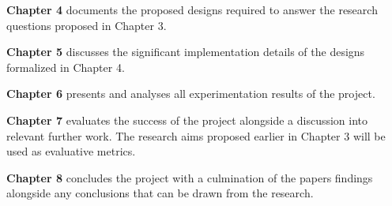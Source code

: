 \textbf{Chapter 4} documents the proposed designs required to answer the research questions proposed in Chapter 3.

\textbf{Chapter 5} discusses the significant implementation details of the designs formalized in Chapter 4.

\textbf{Chapter 6} presents and analyses all experimentation results of the project.

\textbf{Chapter 7} evaluates the success of the project alongside a discussion into relevant further work. The research aims proposed earlier in Chapter 3 will be used as evaluative metrics.

\textbf{Chapter 8} concludes the project with a culmination of the papers findings alongside any conclusions that can be drawn from the research.